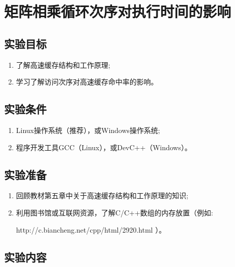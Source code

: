 
\chapter{矩阵相乘循环次序对执行时间的影响}

\section{实验目标}

\begin{enumerate}
	\item 了解高速缓存结构和工作原理;
	\item 学习了解访问次序对高速缓存命中率的影响。
\end{enumerate}

\section{实验条件}

\begin{enumerate}
	\item Linux操作系统（推荐），或Windows操作系统;
	\item 程序开发工具GCC（Linux），或DevC++（Windows）。
\end{enumerate}

\section{实验准备}

\begin{enumerate}
	\item 回顾教材第五章中关于高速缓存结构和工作原理的知识;
	\item 利用图书馆或互联网资源，了解C/C++数组的内存放置（例如: 

		http://c.biancheng.net/cpp/html/2920.html ）。
\end{enumerate}

\section{实验内容}

